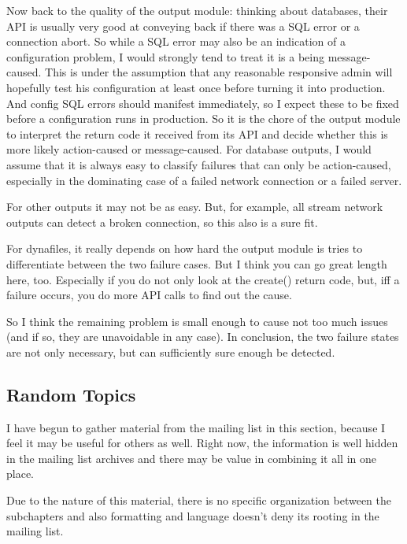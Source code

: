 \documentclass[a4paper,10pt]{article}
\begin{document}
Now back to the quality of the output module: thinking about databases, their
API is usually very good at conveying back if there was a SQL error or a
connection abort. So while a SQL error may also be an indication of a
configuration problem, I would strongly tend to treat it is a being
message-caused. This is under the assumption that any reasonable responsive
admin will hopefully test his configuration at least once before turning it
into production. And config SQL errors should manifest immediately, so I
expect these to be fixed before a configuration runs in production. So it is
the chore of the output module to interpret the return code it received from
its API and decide whether this is more likely action-caused or
message-caused. For database outputs, I would assume that it is always easy
to classify failures that can only be action-caused, especially in the
dominating case of a failed network connection or a failed server.

For other outputs it may not be as easy. But, for example, all stream network
outputs can detect a broken connection, so this also is a sure fit.

For dynafiles, it really depends on how hard the output module is tries to differentiate
between the two failure cases. But I think you can go great length here, too.
Especially if you do not only look at the create() return code, but, iff a
failure occurs, you do more API calls to find out the cause.

So I think the remaining problem is small enough to cause not too much issues
(and if so, they are unavoidable in any case). In conclusion, the two failure states are not only necessary, but can sufficiently sure enough be detected.

\subsection{Random Topics}
I have begun to gather material from the mailing list in this section, because I feel it may be useful for others as well. Right now, the information is well hidden in the mailing list archives and there may be value in combining it all in one place.

Due to the nature of this material, there is no specific organization between the subchapters and also formatting and language doesn't deny its rooting in the mailing list.
\end{document}
